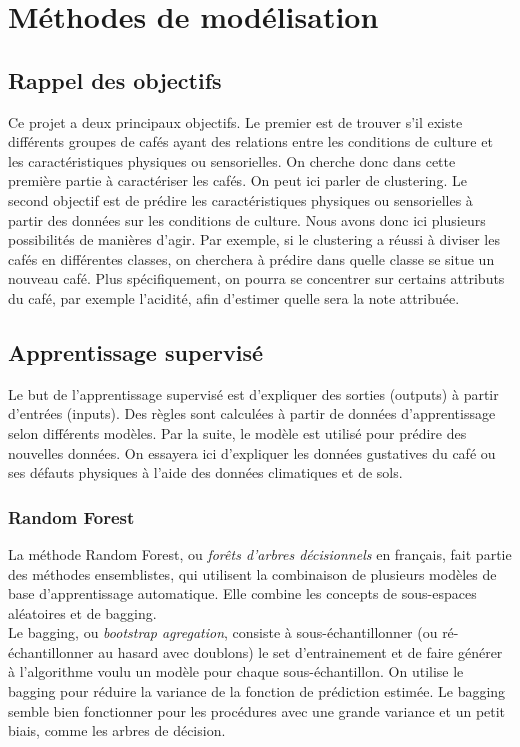 \chapter{Méthodes de modélisation}
\section{Rappel des objectifs}\label{obj}
Ce projet a deux principaux objectifs. Le premier est de trouver s'il existe différents groupes de cafés ayant des relations entre les conditions de culture et les caractéristiques physiques ou sensorielles. On cherche donc dans cette première partie à caractériser les cafés. On peut ici parler de clustering.  Le second objectif est de prédire les caractéristiques physiques ou sensorielles à partir des données sur les conditions de culture. Nous avons donc ici plusieurs possibilités de manières d'agir. Par exemple, si le clustering a réussi à diviser les cafés en différentes classes, on cherchera à prédire dans quelle classe se situe un nouveau café. Plus spécifiquement, on pourra se concentrer sur certains attributs du café, par exemple l'acidité, afin d'estimer quelle sera la note attribuée. 


\section{Apprentissage supervisé}
Le but de l'apprentissage supervisé est d'expliquer des sorties (outputs) à partir d'entrées (inputs). Des règles sont calculées à partir de données d'apprentissage selon différents modèles. Par la suite, le modèle est utilisé pour prédire des nouvelles données. On essayera ici d'expliquer les données gustatives du café ou ses défauts physiques à l'aide des données climatiques et de sols. 


\subsection{Random Forest}

La méthode Random Forest, ou \textit{forêts d'arbres décisionnels} en français, fait partie des méthodes ensemblistes\cite{EnsembleMethods}, qui utilisent la combinaison de plusieurs modèles de base d'apprentissage automatique. Elle combine les concepts de sous-espaces aléatoires et de bagging.\\

\noindent Le bagging\label{bagging}, ou \textit{bootstrap agregation}, consiste à sous-échantillonner (ou ré-échantillonner au hasard avec doublons) le set d'entrainement et de faire générer à l’algorithme voulu un modèle pour chaque sous-échantillon. On utilise le bagging pour réduire la variance de la fonction de prédiction estimée. Le bagging semble bien fonctionner pour les procédures avec une grande variance et un petit biais, comme les arbres de décision. \cite{hastie_09_elements-of.statistical-learning}\\


